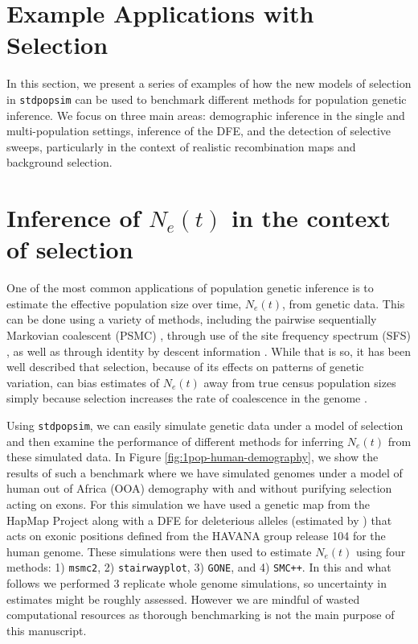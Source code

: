 \documentclass[hidelinks]{article}
\newcommand{\stdpopsim}{\texttt{stdpopsim}\xspace}
\newcommand{\msmc}{\texttt{msmc2}\xspace}
\newcommand{\stairway}{\texttt{stairwayplot}\xspace}
\newcommand{\gone}{\texttt{GONE}\xspace}
\newcommand{\smcpp}{\texttt{SMC++}\xspace}
\begin{document}
    
\section*{Example Applications with Selection}
    \label{applications}
    In this section, we present a series of examples of how the new models of selection
    in \stdpopsim can be used to benchmark different
    methods for population genetic inference.
    We focus on three main areas: demographic inference in the 
    single and multi-population settings, inference of the DFE,
    and the detection of selective sweeps, particularly in the context of realistic recombination maps and background selection.

    \section*{Inference of $N_e(t)$ in the context of selection}
    One of the most common applications of population genetic inference is to estimate
    the effective population size over time, $N_e(t)$, from genetic data. This can be done
    using a variety of methods, including the pairwise sequentially Markovian coalescent
    (PSMC) \citep{li2011inference}, through use of the site frequency spectrum (SFS) \citep{liu2020stairway},
    as well as through identity by descent information \citep{santiago2020recent}. 
    While that is so, it has been well described that selection, because of its effects on
    patterns of genetic variation, can bias estimates of $N_e(t)$
    away from true census population sizes simply because selection increases the 
    rate of coalescence in the genome \citep[e.g.][]{schrider2016effects}. 

    Using \stdpopsim, we can easily simulate genetic data under a model of selection and then 
    examine the performance of different methods for inferring $N_e(t)$ from these simulated 
    data. In Figure \ref{fig:1pop-human-demography}, we show the results of such a benchmark
    where we have simulated genomes under a model of human out of Africa (OOA) demography
    with and without purifying selection acting on exons.
    For this simulation we have used
    a genetic map from the HapMap Project \citep{international2007second} along with a
    DFE for deleterious alleles (estimated by \cite{huber2017determining})
    that acts on exonic positions defined from the HAVANA group release 104 for the human genome.
    These simulations were then used to estimate $N_e(t)$ using four methods: 1) \msmc \citep{Schiffels2020}, 
    2) \stairway \citep{liu2020stairway}, 3) \gone \citep{santiago2020recent}, and 4) \smcpp \citep{terhorst2017robust}.
    In this and what follows we performed 3 replicate whole genome simulations, so uncertainty in estimates might
    be roughly assessed.
    However we are mindful of wasted computational resources as thorough benchmarking
    is not the main purpose of this manuscript.
    
\end{document}
